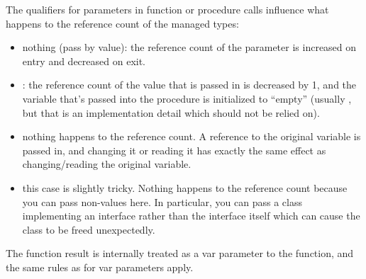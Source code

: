 The qualifiers for parameters in function or procedure calls influence
what happens to the reference count of the managed types:
\begin{itemize}
\item nothing (pass by value): the reference count of the parameter is increased
on entry and decreased on exit.
\item {}: the reference count of the value that is passed in is decreased by 1,
 and the variable that's passed into the procedure is initialized to ``empty''
(usually , but that is an implementation detail which should not
be relied on).
\item {} nothing happens to the reference count. A reference to the original
 variable is passed in, and changing it or reading it has exactly the same effect as changing/reading the original variable.
\item {} this case is slightly tricky. Nothing happens to the reference
count because you can pass non-values here.
In particular, you can pass a class implementing an interface rather than the interface itself
which can cause the class to be freed unexpectedly.
\end{itemize}

\begin{remark}
The function result is internally treated as a var parameter to the
function, and the same rules as for var parameters apply.
\end{remark}

